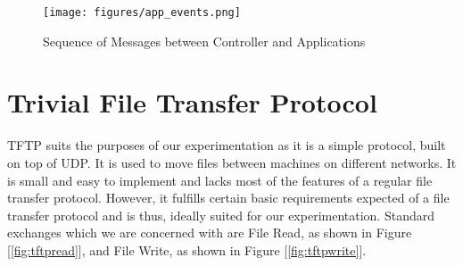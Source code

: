 \setlength{\belowcaptionskip}{-10pt}

\begin{figure}[h]
\centering
\texttt{[image: figures/app\_events.png]}
\caption{Sequence of Messages between Controller and Applications}
\label{fig:seqevents}
\end{figure}

\begin{comment}
\section{Topology}

A simple SDN network can be designed, using minimal devices such that it can be used to show both coding and regeneration. Such a network   [\ref{fig:topology}] can be designed with an OpenFlow Controller and OpenFlow-enabled switches. The topology we design consists of a ring network of five switches with a central controller. The central controller would have an application customizing the network behavior for our storage purposes, depending on our final design. The switches may have additional functionality, as compared to standard OpenFlow switches, depending on our design , in order to provide desired results. 

\begin{figure}
\centering
\texttt{[image: figures/topology.jpeg]}
\caption{System Topology}
\label{fig:topology}
\end{figure}
\setlength{\belowcaptionskip}{0pt}

Such a topology would potentially allow us to obtain three advantages , namely, to leverage SDN to minimise network traffic ,optimally route the traffic to avoid network congestion and maintain metadata about the network and file locations at a central location, preferably at the controller application itself. By keeping spare disks for use at some of the internal servers, we may also be able to simulate disk failure and rebuild scenarios by rebuilding onto a fresh disk from one about to fail.  

\end{comment}


\section{Trivial File Transfer Protocol}

TFTP suits the purposes of our experimentation as it is a simple protocol, built on top of UDP. It is used to move files between machines on different networks. It is small and easy to implement and lacks most of the features of a regular file transfer protocol. However, it fulfills certain basic requirements expected of a file transfer protocol and is thus, ideally suited for our experimentation. Standard exchanges which we are concerned with are File Read, as shown in Figure [\ref{fig:tftpread}], and File Write, as shown in Figure [\ref{fig:tftpwrite}]. 

